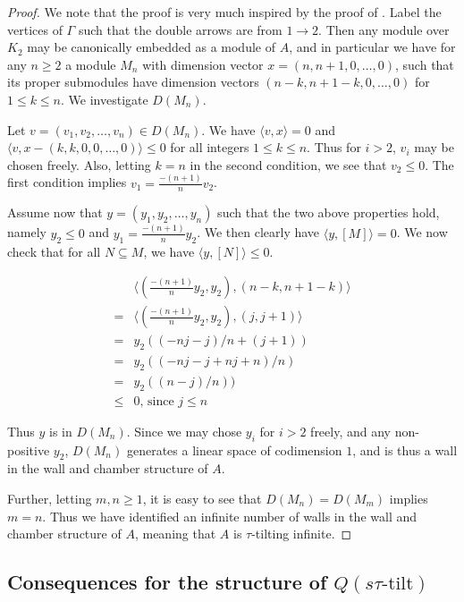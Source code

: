 \documentclass[]{article}
\theoremstyle{definition}
\newcommand{\tu}{\ensuremath{\tau}}
\begin{document}
\begin{proof}
	We note that the proof is very much inspired by the proof of \cite[Theorem 4.14]{Br_stle_2019}. Label the vertices of $\Gamma$ such that the double arrows are from $1 \to 2$. Then any module over $K_2$ may be canonically embedded as a module of $A$, and in particular we have for any $n \geq 2$ a module $M_n$ with dimension vector $x = (n,n+1,0,\dots,0)$, such that its proper submodules have dimension vectors $(n-k,n+1-k,0,\dots,0)$ for $1 \leq k \leq n$. We investigate $D(M_n)$.
	
	Let $v = (v_1,v_2,\dots,v_n) \in D(M_n)$. We have $\langle v,x \rangle = 0$ and $\langle v,x - (k,k,0,0,\dots,0)\rangle \leq 0$ for all integers $1 \leq k \leq n$. Thus for $i > 2$, $v_i$ may be chosen freely. Also, letting $k = n$ in the second condition, we see that $v_2 \leq 0$. The first condition implies $v_1 = \frac{-(n+1)}{n}v_2$.
	
	Assume now that $y = (y_1,y_2,\dots,y_n)$ such that the two above properties hold, namely $y_2 \leq 0$ and $y_1 = \frac{-(n+1)}{n}y_2$. We then clearly have $\langle y,[M]\rangle = 0$. We now check that for all $N \subseteq M$, we have $\langle y,[N]\rangle \leq 0$. 
	
	\begin{align}
	&\langle (\frac{-(n+1)}{n}y_2,y_2), (n-k,n+1-k)\rangle \\
	=&\langle (\frac{-(n+1)}{n}y_2,y_2), (j,j+1)\rangle \\
	=& y_2((-nj-j)/n + (j+1)) \\
	=& y_2((-nj - j + nj + n)/n) \\
	=& y_2((n-j)/n)) \\
	\leq& 0\text{, since } j \leq n
	\end{align}
	
	Thus $y$ is in $D(M_n)$. Since we may chose $y_i$ for $i > 2$ freely, and any non-positive $y_2$, $D(M_n)$ generates a linear space of codimension $1$, and is thus a wall in the wall and chamber structure of $A$.
	
	Further, letting $m,n \geq 1$, it is easy to see that $D(M_n) = D(M_m)$ implies $m = n$. Thus we have identified an infinite number of walls in the wall and chamber structure of $A$, meaning that $A$ is \tu-tilting infinite.
	
\end{proof}


\subsection{Consequences for the structure of $Q(s\tu\text{-tilt})$}
\end{document}
